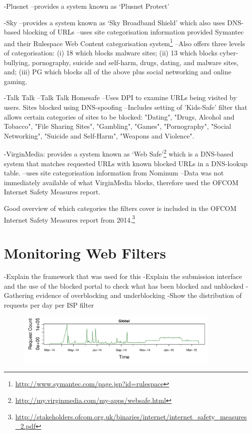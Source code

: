 \documentclass{bmcart}
\begin{document}
-Plusnet
--provides a system known as `Plusnet Protect'

-Sky
--provides a system known as `Sky Broadband Shield'  which also uses DNS-based blocking of URLs
--uses site categorisation information provided Symantec and their Rulespace Web Content categorisation system\footnote{\url{http://www.symantec.com/page.jsp?id=rulespace}} 
--Also offers three levels of categorisation: (i) 18 which blocks malware sites; (ii) 13 which blocks cyber-bullying, pornography, suicide and self-harm, drugs, dating, and malware sites, and; (iii) PG which blocks all of the above plus social networking and online gaming.

-Talk Talk
--Talk Talk Homesafe
--Uses DPI to examine URLs being visited by users. Sites blocked using DNS-spoofing
--Includes setting of 'Kids-Safe' filter that allows certain categories of sites to be blocked: "Dating", "Drugs, Alcohol and Tobacco", "File Sharing Sites", "Gambling", "Games", "Pornography", "Social Networking", "Suicide and Self-Harm", "Weapons and Violence".


-VirginMedia: provides a system known as `Web Safe'\footnote{\url{http://my.virginmedia.com/my-apps/websafe.html}} which is a DNS-based system that matches requested URLs with known blocked URLs in a DNS-lookup table.
--uses site categorisation information from Nominum
--Data was not immediately available of what VirginMedia blocks, therefore used the OFCOM Internet Safety Measures report.

Good overview of which categories the filters cover is included in the OFCOM Internet Safety Measures report from 2014.\footnote{\url{http://stakeholders.ofcom.org.uk/binaries/internet/internet_safety_measures_2.pdf}}


\clearpage
\section*{Monitoring Web Filters}
-Explain the framework that was used for this
-Explain the submission interface and the use of the blocked portal to check what has been blocked and unblocked
-Gathering evidence of overblocking and underblocking
-Show the distribution of requests per day per ISP filter

\begin{figure}[h!]
\caption{}
\includegraphics[width=0.9\textwidth]{imgs/ts-global-requests.pdf}
\end{figure}
\end{document}
